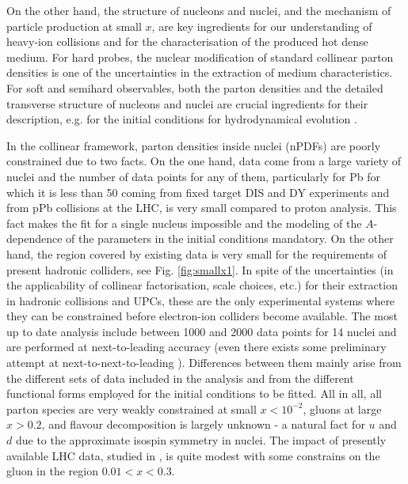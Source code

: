 \documentclass[../report.tex]{subfiles}
\begin{document}
On the other hand, the structure of nucleons and nuclei, and the mechanism of particle production at small $x$, are key ingredients for our understanding of heavy-ion collisions and for the characterisation of the produced hot dense medium. For hard probes, the nuclear modification of standard collinear parton densities is one of the uncertainties in the extraction of medium characteristics. For soft and semihard observables, both the parton densities and the detailed transverse structure of nucleons and nuclei are crucial ingredients for their description, e.g. for the initial conditions for hydrodynamical evolution \cite{Liu:2015nwa,Weller:2017tsr,Mantysaari:2017cni}.

In the collinear framework, parton densities inside nuclei (nPDFs) \cite{Paukkunen:2017bbm,armestodis2018} are poorly constrained due to two facts. On the one hand, data come from a large variety of nuclei and the number of data points for any of them, particularly for Pb for which it is less than 50 coming from fixed target DIS and DY experiments and from pPb collisions at the LHC, is very small compared to proton analysis. This fact makes the fit for a single nucleus impossible and the modeling of the $A$-dependence of the parameters in the initial conditions mandatory. On the other hand, the region covered by existing data is very small for the requirements of present hadronic colliders, see Fig. \ref{fig:smallx1}. In spite of the uncertainties (in the applicability of collinear factorisation, scale choices, etc.) for their extraction in hadronic collisions and UPCs, these are the only experimental systems where they can be constrained before electron-ion colliders become available. The most up to date analysis include between 1000 and 2000 data points for 14 nuclei and are performed at next-to-leading accuracy \cite{deFlorian:2011fp,Kovarik:2015cma,Eskola:2016oht} (even there exists some preliminary attempt at next-to-next-to-leading \cite{Khanpour:2016pph}). Differences between them mainly arise from the different sets of data included in the analysis and from the different functional forms employed for the initial conditions to be fitted. All in all, all parton species are very weakly constrained at small $x<10^{-2}$, gluons at large $x>0.2$, and flavour decomposition is largely unknown - a natural fact for $u$ and $d$ due to the approximate isospin symmetry in nuclei. The impact of presently available LHC data, studied in \cite{Eskola:2016oht}, is quite modest with some constrains on the gluon in the region $0.01<x<0.3$.
\end{document}
